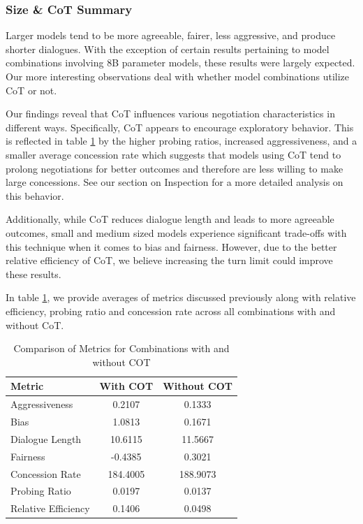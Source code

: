 \documentclass[11pt]{article}
\begin{document}
\subsubsection{Size \& CoT Summary}
Larger models tend to be more agreeable, fairer, less aggressive, and produce shorter dialogues. With the exception of certain results pertaining to model combinations involving 8B parameter models, these results were largely expected. Our more interesting observations deal with whether model combinations utilize CoT or not. 

Our findings reveal that CoT influences various negotiation characteristics in different ways. Specifically, CoT appears to encourage exploratory behavior. This is reflected in table \ref{tab:cot_comparison} by the higher probing ratios, increased aggressiveness, and a smaller average concession rate which suggests that models using CoT tend to prolong negotiations for better outcomes and therefore are less willing to make large concessions. See our section on Inspection for a more detailed analysis on this behavior. 

Additionally, while CoT reduces dialogue length and leads to more agreeable outcomes, small and medium sized models experience significant trade-offs with this technique when it comes to bias and fairness. However, due to the better relative efficiency of CoT, we believe increasing the turn limit could improve these results.

In table \ref{tab:cot_comparison}, we provide averages of metrics discussed previously along with relative efficiency, probing ratio and concession rate across all combinations with and without CoT. 
\begin{table}[h!]
    \centering
    \caption{Comparison of Metrics for Combinations with and without COT}
    \label{tab:cot_comparison}
    \begin{tabular}{l|c|c}
        \hline  
        \textbf{Metric} & \textbf{With COT} & \textbf{Without COT} \\
        \hline
        Aggressiveness    & 0.2107   & 0.1333  \\
        Bias              & 1.0813   & 0.1671  \\
        Dialogue Length   & 10.6115  & 11.5667 \\
        Fairness          & -0.4385  & 0.3021  \\
        Concession Rate   & 184.4005 & 188.9073 \\
        Probing Ratio     & 0.0197   & 0.0137  \\
        Relative Efficiency & 0.1406  & 0.0498  \\
        \hline
    \end{tabular}
\end{table}
\end{document}
